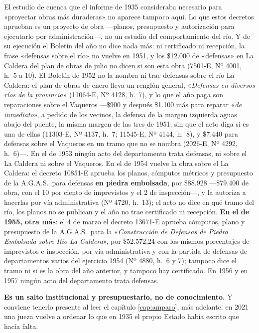 \begin{cautela}
El estudio de cuenca que el informe de 1935 consideraba necesario para «proyectar obras más
duraderas» no aparece tampoco aquí. Lo que estos decretos aprueban es un proyecto de obra
---planos, presupuesto y autorización para ejecutarlo por administración---, no un estudio del comportamiento del río. Y de su ejecución el Boletín del año no dice nada más: ni certificado ni recepción, la frase «defensas sobre el río» no vuelve en 1951, y los \$12.000 de «defensas» en La Caldera del plan de obras de julio no dicen si son esta obra (7501-E, Nº 4001, h.\ 5 a 10). El Boletín de 1952 no la nombra ni trae defensas sobre el río La Caldera: el plan de obras de enero lleva un renglón general, «\textit{Defensas en diversos ríos de la provincia}» (11064-E, Nº 4128, h.\ 7), y lo que el año paga son reparaciones sobre el Vaqueros ---\$900 y después \$1.100 más para reparar «\textit{de inmediato}», a pedido de los vecinos, la defensa de la margen izquierda aguas abajo del puente, la misma margen de las tres de 1951, sin que el acto diga si es una de ellas (11303-E, Nº 4137, h.\ 7; 11545-E, Nº 4144, h.\ 8), y \$7.440 para defensas sobre el Vaqueros en un tramo que no se nombra (2026-E, Nº 4292, h.\ 6)---. En el de 1953 ningún acto del departamento trata defensas, ni sobre el La Caldera ni sobre el Vaqueros. En el de 1954 vuelve la obra sobre el La Caldera: el decreto 10851-E aprueba los planos, cómputos métricos y presupuesto de la A.G.A.S.\ para defensas \textbf{en piedra embolsada}, por \$88.928 ---\$79.400 de obra, con el 10 por ciento de imprevistos y el 2 de inspección---, y la autoriza a hacerlas por vía administrativa (Nº 4720, h.\ 13); el acto no dice en qué tramo del río, los planos no se publican y el año no trae certificado ni recepción. \textbf{En el de 1955, otra más}: el 4 de marzo el decreto 13671-E aprueba cómputos, plano y presupuesto de la A.G.A.S.\ para la «\textit{Construcción de Defensas de Piedra Embolsada sobre Río La Caldera}», por \$52.572,24 con los mismos porcentajes de imprevistos e inspección, por vía administrativa y con la partida de defensas de departamentos varios del ejercicio 1954 (Nº 4880, h.\ 6 y 7); tampoco dice el tramo ni si es la obra del año anterior, y tampoco hay certificado. En 1956 y en 1957 ningún acto del departamento trata defensas.

\textbf{Es un salto institucional y presupuestario, no de conocimiento.} Y conviene tenerlo
presente al leer el capítulo \ref{cap:amparo}, más adelante: en 2021 una jueza vuelve a ordenar lo que en 1935 el propio
Estado había escrito que hacía falta.
\end{cautela}

